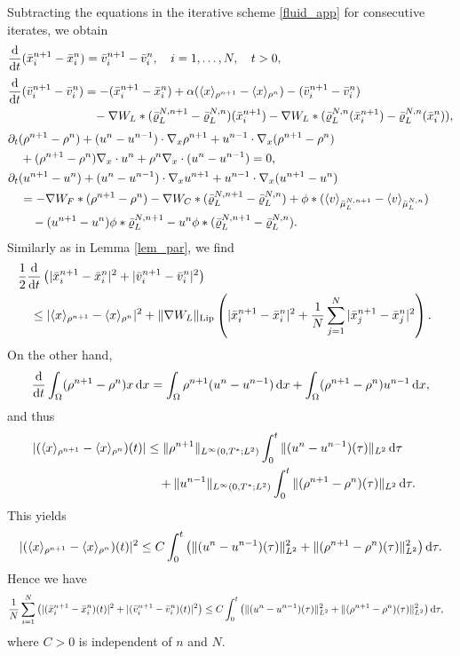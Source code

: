 \documentclass[10pt, reqno]{amsart}
\theoremstyle{definition}
\theoremstyle{remark}
\numberwithin{equation}{section}
\newcommand{\dx}{\textnormal{d}x}
\newcommand{\dtau}{\textnormal{d}\tau}
\newcommand{\ddt}{\frac{\textnormal{d}}{\textnormal{d}t}}
\begin{document}
Subtracting the equations in the iterative scheme \eqref{fluid_app} for consecutive iterates, we obtain
$$\begin{aligned}
    &\ddt (\bar{x}_i^{n+1} -\bar{x}_i^{n} ) = \bar{v}_i^{n+1} - \bar{v}_i^{n}, \quad i = 1,\dots, N, \quad t > 0,\\[1mm]
    &\ddt (\bar{v}_i^{n+1} - \bar{v}_i^{n}) = -(\bar{x}_i^{n+1} - \bar{x}_i^{n})  + \alpha( \langle x \rangle_{\rho^{n+1}} - \langle x \rangle_{\rho^{n}} )- (\bar{v}_i^{n+1} - \bar{v}_i^{n})\cr
    &\hspace{2.5cm} - \nabla W_L *  ( \bar\varrho_{L}^{N, n+1} - \bar\varrho_{L}^{N, n})(\bar{x}_i^{n+1}) - \nabla W_L * (   \bar\varrho_{L}^{N, n}(\bar x_i^{n+1}) -  \bar\varrho_{L}^{N, n}(\bar x_i^{n})) ,\\[1mm]
&\partial_t (\rho^{n+1} - \rho^n) + (u^n - u^{n-1})\cdot \nabla_x \rho^{n+1} + u^{n-1} \cdot \nabla_x (\rho^{n+1} - \rho^n)\cr
&\quad + (\rho^{n+1} - \rho^n)\nabla_x \cdot u^n + \rho^n \nabla_x \cdot (u^n - u^{n-1}) = 0,\cr
&\partial_t (u^{n+1} - u^n) + (u^n - u^{n-1})\cdot\nabla_x u^{n+1} + u^{n-1} \cdot \nabla_x (u^{n+1} - u^n)\cr
&\quad = -\nabla W_F * (\rho^{n+1} - \rho^n) - \nabla W_C *   (\bar\varrho^{N, n+1}_L - \bar\varrho^{N, n}_L) + \phi *   (\langle v \rangle_{\bar\mu^{N, n+1}_L} - \langle v \rangle_{\bar\mu^{N, n}_L}) \cr
&\qquad - (u^{n+1} - u^n) \phi *  \bar\varrho^{N, n+1}_L - u^n \phi *   (\bar\varrho^{N, n+1}_L - \bar\varrho^{N, n}_L).
\end{aligned}$$
Similarly as in Lemma \ref{lem_par}, we find 
\begin{align*}
&\frac12\ddt\left(|\bar{x}_i^{n+1} -\bar{x}_i^{n}|^2 + |\bar{v}_i^{n+1} - \bar{v}_i^{n}|^2 \right) \cr
&\quad \leq |\langle x \rangle_{\rho^{n+1}} - \langle x \rangle_{\rho^{n}}|^2 + \|\nabla W_L\|_{\rm Lip}\left( |\bar{x}_i^{n+1} -\bar{x}_i^{n}|^2 + \frac1N \sum_{j=1}^N |\bar{x}_j^{n+1} -\bar{x}_j^{n}|^2\right).
\end{align*}
On the other hand, 
\[
\ddt\int_{\Omega} (\rho^{n+1} - \rho^n) x\,\dx = \int_{\Omega} \rho^{n+1}(u^n - u^{n-1})\,\dx + \int_{\Omega} (\rho^{n+1} - \rho^n) u^{n-1}\,\dx,
\]
and thus
\begin{align*}
|(\langle x \rangle_{\rho^{n+1}} - \langle x \rangle_{\rho^{n}})(t)| &\leq \|\rho^{n+1}\|_{L^\infty(0,T^*; L^2)} \int_0^t \|(u^n - u^{n-1})(\tau)\|_{L^2}\,\dtau \cr
&\quad + \|u^{n-1}\|_{L^\infty(0,T^*;L^2)} \int_0^t \|(\rho^{n+1} - \rho^n)(\tau)\|_{L^2}\,\dtau.
\end{align*}
This yields
\[
 |(\langle x \rangle_{\rho^{n+1}} - \langle x \rangle_{\rho^{n}})(t)|^2 \leq C\int_0^t \left(\|(u^n - u^{n-1})(\tau)\|_{L^2}^2 + \|(\rho^{n+1} - \rho^n)(\tau)\|_{L^2}^2\right)\dtau.
\]
Hence we have
\begin{align*}
&\frac1{N}\sum_{i=1}^N\left(|(\bar{x}_i^{n+1} -\bar{x}_i^{n})(t)|^2 + |(\bar{v}_i^{n+1} - \bar{v}_i^{n})(t)|^2 \right)   \leq C\int_0^t \left(\|(u^n - u^{n-1})(\tau)\|_{L^2}^2 + \|(\rho^{n+1} - \rho^n)(\tau)\|_{L^2}^2\right)\dtau,
\end{align*}
where $C>0$ is independent of $n$ and $N$.
\end{document}
